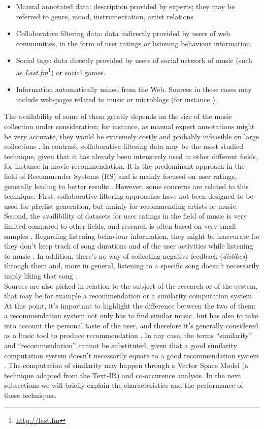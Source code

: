 \begin{itemize}
\item Manual annotated data: description provided by experts; they may be referred to genre, mood, instrumentation, artist relations.
\item Collaborative filtering data: data indirectly provided by users of web communities, in the form of user ratings or listening behaviour information.
\item Social tags: data directly provided by users of social network of music (such as \textit{Last.fm}\footnote{\url{http://last.fm}}) or social games.
\item Information automatically mined from the Web. Sources in these cases may include web-pages related to music or microblogs (for instance ).
\end{itemize}
 The availability of some of them greatly depends on the size of the music collection under consideration; for instance, as manual expert annotations might be very accurate, they would be extremely costly and probably infeasible on large collections \cite{Szyma09}. In contrast, collaborative filtering data may be the most studied technique, given that it has already been intensively used in other different fields, for instance in movie recommendation. It is the predominant approach in the field of Recommender Systems (RS) \cite{jannach12} and is mainly focused on user ratings, generally leading to better results \cite{green09}. However, some concerns are related to this technique. First, collaborative filtering approaches have not been designed to be used for playlist generation, but mainly for recommending artists or music. Second, the availibility of datasets for user ratings in the field of music is very limited compared to other fields, and research is often based on very small samples \cite{liu09}. Regarding listening behaviour information, they might be inaccurate for they don't keep track of song durations and of the user activities while listening to music \cite{jawaheer10}. In addition, there's no way of collecting negative feedback (\textit{dislikes}) through them and, more in general, listening to a specific song doesn't necessarily imply liking that song \cite{bogdanov13}. \\Sources are also picked in relation to the subject of the research or of the system, that may be for example a recommendation or a similarity computation system. At this point, it's important to highlight the difference between the two of them: a recommendation system not only has to find similar music, but has also to take into account the personal taste of the user, and therefore it's generally considered as a basic tool to produce recommendation \cite{celma08}. In any case, the terms ``similarity'' and ``recommendation'' cannot be substituted, given that a good similarity computation system doesn't necessarily equate to a good recommendation system \cite{mcnee06}. 
 The computation of similarity may happen through a Vector Space Model (a technique adapted from the Text-IR) and co-occurence analysis. In the next subsections we will briefly explain the characteristics and the performance of these techniques.

